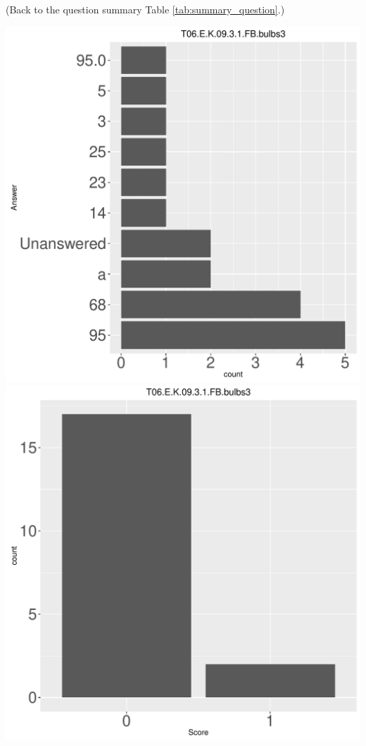 \documentclass[12pt,english,nohyper]{tufte-handout}\usepackage[]{graphicx}\usepackage[]{color}
\begin{document}
 (Back to the question summary Table \ref{tab:summary_question}.)

\begin{center} \includegraphics[width=.45\linewidth]{Topic06_AB_35_answer} \includegraphics[width=.45\linewidth]{Topic06_AB_35_score} \end{center} 
\end{document}
